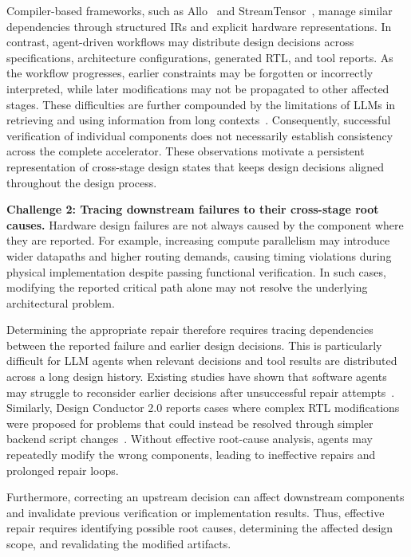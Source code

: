 \documentclass[conference]{IEEEtran}
\begin{document}
Compiler-based frameworks, such as Allo~\cite{allo} and StreamTensor~\cite{streamtensor}, manage similar dependencies through structured IRs and explicit hardware representations. In contrast, agent-driven workflows may distribute design decisions across specifications, architecture configurations, generated RTL, and tool reports. As the workflow progresses, earlier constraints may be forgotten or incorrectly interpreted, while later modifications may not be propagated to other affected stages. These difficulties are further compounded by the limitations of LLMs in retrieving and using information from long contexts~\cite{in2,helmet,readagent}. Consequently, successful verification of individual components does not necessarily establish consistency across the complete accelerator. These observations motivate a persistent representation of cross-stage design states that keeps design decisions aligned throughout the design process.

\noindent\textbf{Challenge 2: Tracing downstream failures to their cross-stage root causes.} Hardware design failures are not always caused by the component where they are reported. For example, increasing compute parallelism may introduce wider datapaths and higher routing demands, causing timing violations during physical implementation despite passing functional verification. In such cases, modifying the reported critical path alone may not resolve the underlying architectural problem.

Determining the appropriate repair therefore requires tracing dependencies between the reported failure and earlier design decisions. This is particularly difficult for LLM agents when relevant decisions and tool results are distributed across a long design history. Existing studies have shown that software agents may struggle to reconsider earlier decisions after unsuccessful repair attempts~\cite{swesearch}. Similarly, Design Conductor 2.0 reports cases where complex RTL modifications were proposed for problems that could instead be resolved through simpler backend script changes~\cite{designconductor2}. Without effective root-cause analysis, agents may repeatedly modify the wrong components, leading to ineffective repairs and prolonged repair loops.

Furthermore, correcting an upstream decision can affect downstream components and invalidate previous verification or implementation results. Thus, effective repair requires identifying possible root causes, determining the affected design scope, and revalidating the modified artifacts.
\end{document}
